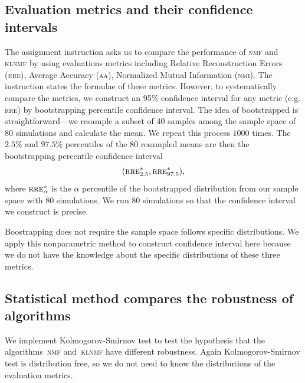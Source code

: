 \subsection{Evaluation metrics and their confidence intervals \label{ci}}
The assignment instruction asks us to compare the performance of \textsc{nmf} and \textsc{klnmf} by using evaluations metrics including Relative Reconstruction Errors (\textsc{rre}), Average Accuracy (\textsc{aa}), Normalized Mutual Information (\textsc{nmi}). The instruction states the formulae of these metrics. However, to systematically compare the metrics, we construct an 95\% confidence interval for any metric (e.g. \textsc{rre}) by bootstrapping percentile confidence interval. The idea of bootstrapped  is straightforward---we resample a subset of $40$ samples among the sample space of $80$ simulations and calculate the mean. We repeat this process $1000$ times. The $2.5\%$ and $97.5\%$ percentiles of the $80$ resampled means are then the bootstrapping percentile confidence interval
\begin{equation}
(\textsc{rre}^*_{2.5}, \textsc{rre}^*_{97.5}), \label{eq:boot}
\end{equation}
where $\textsc{rre}^*_{\alpha}$ is the $\alpha$ percentile of the bootstrapped distribution from our sample space with $80$ simulations.  We run $80$ simulations so that the confidence interval we construct is precise.

Boostrapping does not require the sample space follows specific distributions. We apply this nonparametric method to construct confidence interval here because we do not have the knowledge about the specific distributions of these three metrics.

\subsection{Statistical method compares the robustness of algorithms}
We implement Kolmogorov-Smirnov test to test the hypothesis that the algorithms~\textsc{nmf} and~\textsc{klnmf} have different robustness. Again Kolmogorov-Smirnov test is distribution free, so we do not need to know the distributions of the evaluation metrics.

